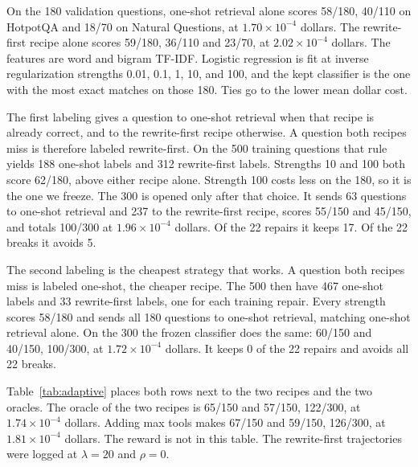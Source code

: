 \documentclass[letterpaper]{article} %
\begin{document}
On the 180 validation questions, one-shot retrieval alone scores 58/180, 40/110 on HotpotQA and 18/70 on Natural Questions, at \(1.70\times 10^{-4}\) dollars. The rewrite-first recipe alone scores 59/180, 36/110 and 23/70, at \(2.02\times 10^{-4}\) dollars. The features are word and bigram TF-IDF. Logistic regression is fit at inverse regularization strengths 0.01, 0.1, 1, 10, and 100, and the kept classifier is the one with the most exact matches on those 180. Ties go to the lower mean dollar cost.

The first labeling gives a question to one-shot retrieval when that recipe is already correct, and to the rewrite-first recipe otherwise. A question both recipes miss is therefore labeled rewrite-first. On the 500 training questions that rule yields 188 one-shot labels and 312 rewrite-first labels. Strengths 10 and 100 both score 62/180, above either recipe alone. Strength 100 costs less on the 180, so it is the one we freeze. The 300 is opened only after that choice. It sends 63 questions to one-shot retrieval and 237 to the rewrite-first recipe, scores 55/150 and 45/150, and totals 100/300 at \(1.96\times 10^{-4}\) dollars. Of the 22 repairs it keeps 17. Of the 22 breaks it avoids 5.

The second labeling is the cheapest strategy that works. A question both recipes miss is labeled one-shot, the cheaper recipe. The 500 then have 467 one-shot labels and 33 rewrite-first labels, one for each training repair. Every strength scores 58/180 and sends all 180 questions to one-shot retrieval, matching one-shot retrieval alone. On the 300 the frozen classifier does the same: 60/150 and 40/150, 100/300, at \(1.72\times 10^{-4}\) dollars. It keeps 0 of the 22 repairs and avoids all 22 breaks.

Table~\ref{tab:adaptive} places both rows next to the two recipes and the two oracles. The oracle of the two recipes is 65/150 and 57/150, 122/300, at \(1.74\times 10^{-4}\) dollars. Adding max tools makes 67/150 and 59/150, 126/300, at \(1.81\times 10^{-4}\) dollars. The reward is not in this table. The rewrite-first trajectories were logged at \(\lambda{=}20\) and \(\rho{=}0\).
\end{document}

